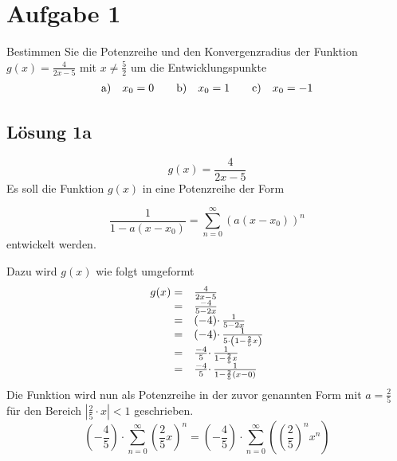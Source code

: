 \section{Aufgabe 1}

Bestimmen Sie die Potenzreihe und den Konvergenzradius der Funktion $\displaystyle g( x) =\frac{4}{2x-5}$ mit $\displaystyle x\neq \frac{5}{2}$ um die Entwicklungspunkte
\begin{align*}
	\begin{array}{ l c }
		\text{a)} & x_{0} =0
	\end{array} & & \begin{array}{ l c }
		\text{b)} & x_{0} =1
	\end{array} & & \begin{array}{ l c }
		\text{c)} & x_{0} =-1
	\end{array}
\end{align*}

\subsection{Lösung 1a}
\begin{equation*}
	g( x) =\frac{4}{2x-5}
\end{equation*}
Es soll die Funktion $\displaystyle g( x)$ in eine Potenzreihe der Form 

\begin{equation*}
	\frac{1}{1-a( x-x_{0})} =\sum _{n=0}^{\infty }( a( x-x_{0}))^{n}
\end{equation*}entwickelt werden.

Dazu wird $\displaystyle g( x)$ wie folgt umgeformt
\begin{equation*}
	\begin{array}{ r l }
		g( x) = & \frac{4}{2x-5}\\
		= & \frac{-4}{5-2x}\\
		= & ( -4) \cdotp \frac{1}{5-2x}\\
		= & ( -4) \cdotp \frac{1}{5\cdotp \left( 1-\frac{2}{5} x\right)}\\
		= & \frac{-4}{5} \cdotp \frac{1}{1-\frac{2}{5} x}\\
		= & \frac{-4}{5} \cdotp \frac{1}{1-\frac{2}{5}( x-0)}
	\end{array}
\end{equation*}
Die Funktion wird nun als Potenzreihe in der zuvor genannten Form mit $\displaystyle a=\frac{2}{5}$ für den Bereich $\displaystyle \left| \frac{2}{5} \cdotp x\right| < 1$ geschrieben. 
\begin{equation*}
	\left( -\frac{4}{5}\right) \cdotp \sum _{n=0}^{\infty }\left(\frac{2}{5} x\right)^{n} =\left( -\frac{4}{5}\right) \cdotp \sum _{n=0}^{\infty }\left(\left(\frac{2}{5}\right)^{n} x^{n}\right)
\end{equation*}


